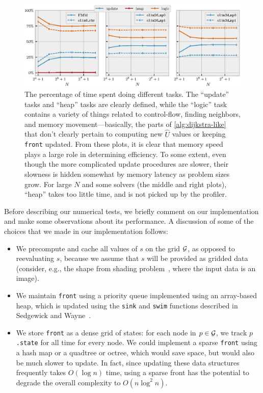 \documentclass[sisc-eikonal.tex]{subfiles}
\begin{document}
\begin{figure}
  \includegraphics[width=\linewidth]{tasks.eps}%
  \vspace{-0.5em}
  \caption{ The percentage of time spent doing different tasks. The
    ``update'' tasks and ``heap'' tasks are clearly defined, while the
    ``logic'' task contains a variety of things related to
    control-flow, finding neighbors, and memory movement---basically,
    the parts of \cref{alg:dijkstra-like} that don't clearly pertain
    to computing new $\hat{U}$ values or keeping \texttt{front}
    updated. From these plots, it is clear that memory speed plays a
    large role in determining efficiency. To some extent, even though
    the more complicated update procedures are slower, their slowness
    is hidden somewhat by memory latency as problem sizes grow. For
    large $N$ and some solvers (the middle and right plots), ``heap''
    takes too little time, and is not picked up by the
    profiler.}\label{fig:tasks}
\end{figure}

Before describing our numerical tests, we briefly comment on our
implementation and make some observations about its performance. A
discussion of some of the choices that we made in our implementation
follows:
\begin{itemize}
\item We precompute and cache all values of $s$ on the grid $\mathcal{G}$,
  as opposed to reevaluating $s$, because we assume that $s$ will be
  provided as gridded data (consider, e.g., the shape from shading
  problem~\cite{kimmel2001optimal}, where the input data is an image).
\item We maintain \texttt{front} using a priority queue implemented
  using an array-based heap, which is updated using the \texttt{sink}
  and \texttt{swim} functions described in Sedgewick and
  Wayne~\cite{sedgewick2011algorithms}.
\item We store \texttt{front} as a dense grid of states: for each node
  in $p \in \mathcal{G}$, we track $p$\texttt{.state} for all time for every
  node. We could implement a sparse \texttt{front} using a hash map or
  a quadtree or octree, which would save space, but would also be much
  slower to update. In fact, since updating these data structures
  frequently takes $O(\log n)$ time, using a sparse front has the
  potential to degrade the overall complexity to $O(n \log^2 n)$.
\end{itemize}
\end{document}
